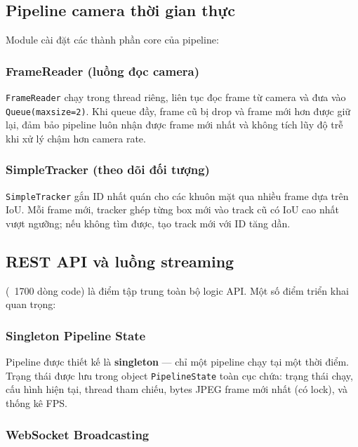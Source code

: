 \subsection{Pipeline camera thời gian thực}
\label{subsec:camerapipeline}

Module  cài đặt các thành phần core của pipeline:

\subsubsection{FrameReader (luồng đọc camera)}

\texttt{FrameReader} chạy trong thread riêng, liên tục đọc frame từ camera và đưa vào \texttt{Queue(maxsize=2)}. Khi queue đầy, frame cũ bị drop và frame mới hơn được giữ lại, đảm bảo pipeline luôn nhận được frame mới nhất và không tích lũy độ trễ khi xử lý chậm hơn camera rate.

\subsubsection{SimpleTracker (theo dõi đối tượng)}

\texttt{SimpleTracker} gắn ID nhất quán cho các khuôn mặt qua nhiều frame dựa trên IoU. Mỗi frame mới, tracker ghép từng box mới vào track cũ có IoU cao nhất vượt ngưỡng; nếu không tìm được, tạo track mới với ID tăng dần.

\subsection{REST API và luồng streaming}
\label{subsec:apiimpl}

 (~1700 dòng code) là điểm tập trung toàn bộ logic API. Một số điểm triển khai quan trọng:

\subsubsection{Singleton Pipeline State}

Pipeline được thiết kế là \textbf{singleton} --- chỉ một pipeline chạy tại một thời điểm. Trạng thái được lưu trong object \texttt{PipelineState} toàn cục chứa: trạng thái chạy, cấu hình hiện tại, thread tham chiếu, bytes JPEG frame mới nhất (có lock), và thống kê FPS.

\subsubsection{WebSocket Broadcasting}

